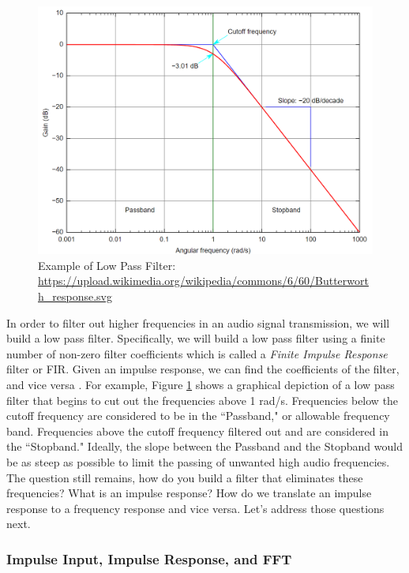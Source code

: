 \begin{figure}[h!]
	\centering
	\includegraphics[scale = .5]{low_pass.png} %
	\caption{Example of Low Pass Filter: \url{https://upload.wikimedia.org/wikipedia/commons/6/60/Butterworth_response.svg}}
	\label{fig:lowpass}
\end{figure}    

In order to filter out higher frequencies in an audio signal transmission, we will build a low pass filter.  Specifically, we will build a low pass filter using a finite number of non-zero filter coefficients which is called a \textit{Finite Impulse Response} filter or FIR.  Given an impulse response, we can find the coefficients of the filter, and vice versa \cite{notes:class}.  For example, Figure \ref{fig:lowpass} shows a graphical depiction of a low pass filter that begins to cut out the frequencies above 1 rad/s.  Frequencies below the cutoff frequency are considered to be in the ``Passband," or allowable frequency band.  Frequencies above the cutoff frequency filtered out and are considered in the ``Stopband."  Ideally, the slope between the Passband and the Stopband would be as steep as possible to limit the passing of unwanted high audio frequencies.  The question still remains, how do you build a filter that eliminates these frequencies?  What is an impulse response?  How do we translate an impulse response to a frequency response and vice versa.  Let's address those questions next. 

\subsubsection{Impulse Input, Impulse Response, and FFT}

